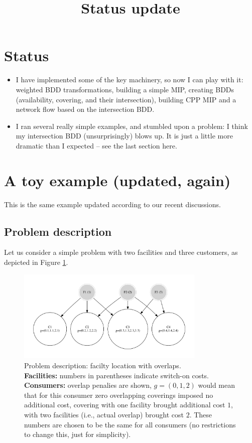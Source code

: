 \documentclass[11pt]{article}
\date{}
\title{Status update}
\begin{document}
\maketitle

\section{Status}
\label{sec:orgb174723}
\begin{itemize}
\item I have implemented some of the key machinery, so now I can play with it:
weighted BDD transformations, building a simple MIP, creating BDDs
(availability, covering, and their intersection), building CPP MIP and a
network flow based on the intersection BDD.
\item I ran several really simple examples, and stumbled upon a problem: I think
my intersection BDD (unsurprisingly) blows up. It is just a little more
dramatic than I expected -- see the last section here.
\end{itemize}

\section{A toy example (updated, again)}
\label{sec:orgba8b2b5}
This is the same example updated according to our recent discussions.
\subsection{Problem description}
\label{sec:org8040ea1}
Let us consider a simple problem with two facilities and three customers, as
depicted in Figure \ref{fig:problem}.

\begin{figure}[h!]
\center
\includegraphics[width=0.8\textwidth]{./problem_dia.gv.pdf}
\caption{Problem description: facilty location with overlaps. \\
\textbf{Facilities:} numbers in parentheses indicate switch-on costs.\\
\textbf{Consumers:} overlap penalies are shown, $g=(0,1,2)$ would mean that for this consumer zero
overlapping coverings imposed no additional cost, covering with one facility brought additional cost $1$,
with two facilities (i.e., actual overlap) brought cost $2$. These numbers are chosen to be the same for
all consumers (no restrictions to change this, just for simplicity).}
\label{fig:problem}
\end{figure}
\end{document}
